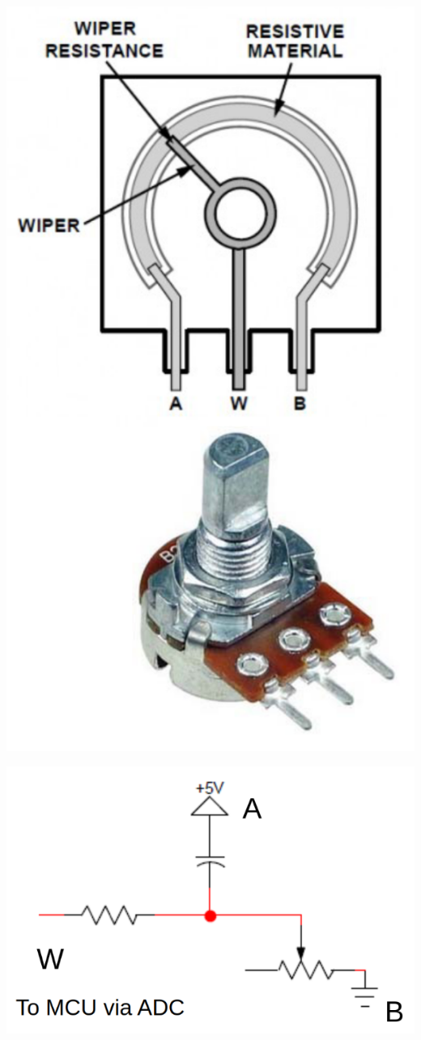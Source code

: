 \documentclass[11pt]{article}
\begin{document}
\begin{center}
\includegraphics[scale=0.5]{./images/potentiometer-diagram.png}
\end{center}

\begin{center}
\includegraphics[scale=0.5]{./images/potentiometer-circuit.png}
\end{center}
\end{document}
